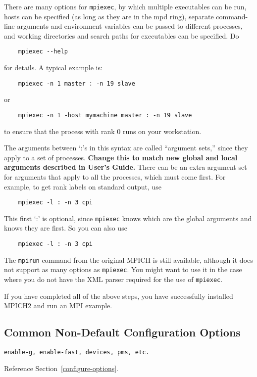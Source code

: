 \documentclass[dvipdfm,11pt]{article}
\begin{document}
\begin{enumerate}
There are many options for \texttt{mpiexec}, by which multiple executables
can be run, hosts can be specified (as long as they are in the mpd
ring), separate command-line arguments and environment variables can
be passed to different processes, and working directories and search
paths for executables can be specified.  Do
\begin{verbatim}
    mpiexec --help
\end{verbatim}
for details. A typical example is:
\begin{verbatim}
    mpiexec -n 1 master : -n 19 slave
\end{verbatim}
or
\begin{verbatim}
    mpiexec -n 1 -host mymachine master : -n 19 slave
\end{verbatim}
to ensure that the process with rank 0 runs on your workstation.

The arguments between `:'s in this syntax are called ``argument sets,''
since they apply to a set of processes.  \textbf{Change this to match
new global and local arguments described in User's Guide.}  There can be
an extra argument set for arguments that apply to all the processes,
which must come first.  For example, to get rank labels on
standard output, use
\begin{verbatim}
    mpiexec -l : -n 3 cpi
\end{verbatim}
This first `:' is optional, since \texttt{mpiexec} knows which are the
global arguments and knows they are first.  So you can also use
\begin{verbatim}
    mpiexec -l : -n 3 cpi
\end{verbatim}
The \texttt{mpirun} command from the original MPICH is still available,
although it does not support as many options as \texttt{mpiexec}.  You might
want to use it in the case where you do not have the XML parser
required for the use of \texttt{mpiexec}.
\end{enumerate}

If you have completed all of the above steps, you have successfully
installed MPICH2 and run an MPI example.  


\subsection{Common Non-Default Configuration Options}
\label{sec:non-default}

\begin{verbatim}
enable-g, enable-fast, devices, pms, etc.
\end{verbatim}
Reference Section~\ref{configure-options}.
\end{document}
